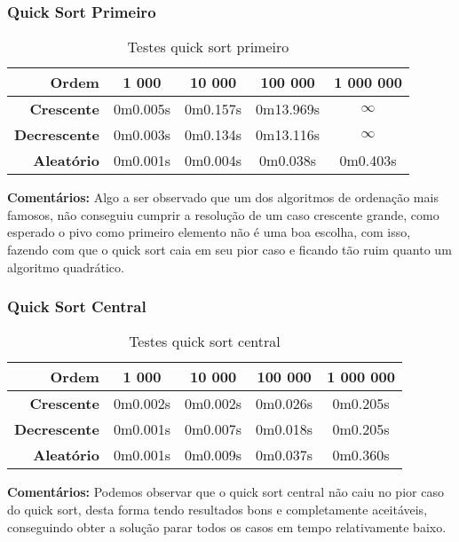 \documentclass[
	12pt,				%
	oneside,			%
	a4paper,			%
	english,			%
	brazil,				%
	]{article}
\begin{document}
\subsubsection{Quick Sort Primeiro}
\begin{table}[H]
\centering
\begin{tabular}{|r|c|c|c|c|}
\cline{1-5} 
 \textbf{Ordem} & \textbf{1 000} & \textbf{10 000} & \textbf{100 000} & \textbf{1 000 000}\\
 \hline
 \textbf{Crescente} & 0m0.005s & 0m0.157s & 0m13.969s & $\infty$ \\
 \hline
 \textbf{Decrescente} & 0m0.003s & 0m0.134s & 0m13.116s & $\infty$ \\
 \hline
 \textbf{Aleat{\'o}rio} & 0m0.001s & 0m0.004s & 0m0.038s & 0m0.403s \\
 \hline
\end{tabular} 
\caption{Testes quick sort primeiro}
\end{table}
\indent \textbf{Comentários:} Algo a ser observado que um dos algoritmos de ordenação mais famosos, não conseguiu cumprir a resolução de um caso crescente grande, como esperado
o pivo como primeiro elemento não é uma boa escolha, com isso, fazendo com que o quick sort caia em seu pior caso e ficando tão ruim quanto um algoritmo quadrático.

\subsubsection{Quick Sort Central}
\begin{table}[H]
\centering
\begin{tabular}{|r|c|c|c|c|}
\cline{1-5} 
 \textbf{Ordem} & \textbf{1 000} & \textbf{10 000} & \textbf{100 000} & \textbf{1 000 000}\\
 \hline
 \textbf{Crescente} & 0m0.002s & 0m0.002s & 0m0.026s & 0m0.205s \\
 \hline
 \textbf{Decrescente} & 0m0.001s & 0m0.007s & 0m0.018s & 0m0.205s \\
 \hline
 \textbf{Aleat{\'o}rio} & 0m0.001s & 0m0.009s & 0m0.037s & 0m0.360s \\
 \hline
\end{tabular} 
\caption{Testes quick sort central}
\end{table}
\indent \textbf{Comentários:} Podemos observar que o quick sort central não caiu no pior caso do quick sort, desta forma tendo resultados bons e completamente aceitáveis,
conseguindo obter a solução parar todos os casos em tempo relativamente baixo.
\end{document}
